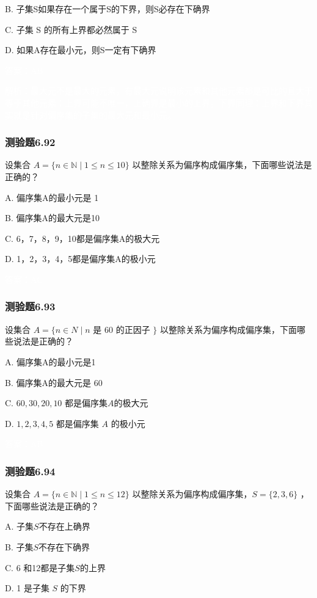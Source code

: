 \documentclass[UTF8, heading=true]{ctexart}
\begin{document}
B. 子集S如果存在一个属于S的下界，则S必存在下确界

C. 子集 S 的所有上界都必然属于 S

D. 如果A存在最小元，则S一定有下确界

\textcolor{white}{答案：AB}

\textcolor{white}{解析：最大元不是最大的元素，有最大元说明该元素和其他元素都是可比的且大于等于其他元素；上界可能不唯一，上确界是最小的上界。下界同理；上界和下界其实就是针对偏序集的子集的最大元和最小元。}

\subsubsection{测验题6.92}

设集合 $A=\{n \in \mathbb{N} \mid 1 \leq n \leq 10\}$ 以整除关系为偏序构成偏序集，下面哪些说法是正确的？

A. 偏序集A的最小元是 1

B. 偏序集A的最大元是10

C. 6，7，8，9，10都是偏序集A的极大元

D.  1，2，3，4，5都是偏序集A的极小元

\textcolor{white}{答案：AC}

\subsubsection{测验题6.93}

设集合 $A=\{n \in N \mid n$ 是 60 的正因子 $\}$ 以整除关系为偏序构成偏序集，下面哪些说法是正确的？

A. 偏序集A的最小元是1

B. 偏序集A的最大元是 60

C.  $60,30,20,10$ 都是偏序集$A$的极大元

D. $1,2,3,4,5$ 都是偏序集 $A$ 的极小元

\textcolor{white}{答案：AB}

\subsubsection{测验题6.94}

设集合 $A=\{n \in \mathbb{N} \mid 1 \leq n \leq 12\}$ 以整除关系为偏序构成偏序集，$S=\{2,3,6\}$ ，下面哪些说法是正确的？

A. 子集$S$不存在上确界

B. 子集$S$不存在下确界

C.  6 和12都是子集$S$的上界

D.   1 是子集 $S$ 的下界
\end{document}
